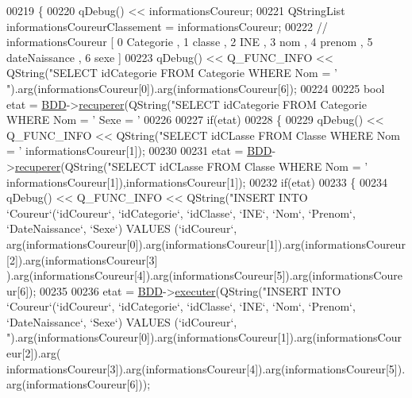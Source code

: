 \begin{DoxyCode}
00219 \{
00220     qDebug() << informationsCoureur;
00221     QStringList informationsCoureurClassement = informationsCoureur;
00222     \textcolor{comment}{// informationsCoureur [ 0 Categorie , 1 classe , 2 INE , 3 nom ,  4 prenom , 5 dateNaissance , 6 sexe
       ]}
00223     qDebug() << Q\_FUNC\_INFO << QString(\textcolor{stringliteral}{"SELECT idCategorie FROM Categorie WHERE Nom = '%
      "}).arg(informationsCoureur[0]).arg(informationsCoureur[6]);
00224 
00225     \textcolor{keywordtype}{bool} etat = \hyperlink{class_gestion_b_d_d_a1bd17cbf5754eb6e54ae351f1d02dca2}{BDD}->\hyperlink{class_base_de_donnees_a77539baad389f5acf754cd2cd452403e}{recuperer}(QString(\textcolor{stringliteral}{"SELECT idCategorie FROM Categorie WHERE Nom = '%
       Sexe = '%
00226 
00227     \textcolor{keywordflow}{if}(etat)
00228     \{
00229         qDebug() << Q\_FUNC\_INFO << QString(\textcolor{stringliteral}{"SELECT idCLasse FROM Classe WHERE Nom = '%
      informationsCoureur[1]);
00230 
00231         etat = \hyperlink{class_gestion_b_d_d_a1bd17cbf5754eb6e54ae351f1d02dca2}{BDD}->\hyperlink{class_base_de_donnees_a77539baad389f5acf754cd2cd452403e}{recuperer}(QString(\textcolor{stringliteral}{"SELECT idCLasse FROM Classe WHERE Nom = '%
      informationsCoureur[1]),informationsCoureur[1]);
00232         \textcolor{keywordflow}{if}(etat)
00233         \{
00234             qDebug() << Q\_FUNC\_INFO << QString(\textcolor{stringliteral}{"INSERT INTO `Coureur`(`idCoureur`, `idCategorie`,
       `idClasse`, `INE`, `Nom`, `Prenom`, `DateNaissance`, `Sexe`) VALUES (`idCoureur`,%
      arg(informationsCoureur[0]).arg(informationsCoureur[1]).arg(informationsCoureur[2]).arg(informationsCoureur[3]
      ).arg(informationsCoureur[4]).arg(informationsCoureur[5]).arg(informationsCoureur[6]);
00235 
00236             etat = \hyperlink{class_gestion_b_d_d_a1bd17cbf5754eb6e54ae351f1d02dca2}{BDD}->\hyperlink{class_base_de_donnees_aa8de5f8f8bb17edc43f5c0ee33712081}{executer}(QString(\textcolor{stringliteral}{"INSERT INTO `Coureur`(`idCoureur`, `idCategorie`,
       `idClasse`, `INE`, `Nom`, `Prenom`, `DateNaissance`, `Sexe`) VALUES (`idCoureur`,%
      "}).arg(informationsCoureur[0]).arg(informationsCoureur[1]).arg(informationsCoureur[2]).arg(
      informationsCoureur[3]).arg(informationsCoureur[4]).arg(informationsCoureur[5]).arg(informationsCoureur[6]));
}}}}
\end{DoxyCode}
